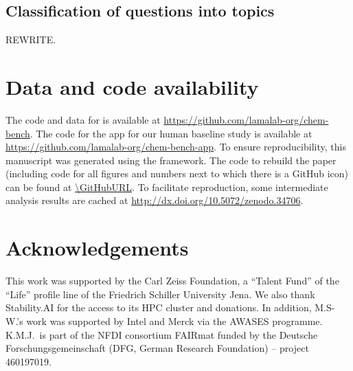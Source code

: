 \documentclass[11pt, oneside]{article}
\begin{document}
\begin{refsection}
\subsection{Classification of questions into topics}\label{sec:meth-topic} 

REWRITE. 

\section*{Data and code availability}
The code and data for \chembench is available at \url{https://github.com/lamalab-org/chem-bench}.
The code for the app for our human baseline study is available at \url{https://github.com/lamalab-org/chem-bench-app}. 
To ensure reproducibility, this manuscript was generated using the \href{https://show-your.work/en/latest/}{\showyourwork} framework.\autocite{Luger2021}
The code to rebuild the paper (including code for all figures and numbers next to which there is a GitHub icon) can be found at \url{\GitHubURL}. 
To facilitate reproduction, some intermediate analysis results are cached at \url{http://dx.doi.org/10.5072/zenodo.34706}.

\section*{Acknowledgements}
This work was supported by the Carl Zeiss Foundation, a \enquote{Talent Fund} of the \enquote{Life} profile line of the Friedrich Schiller University Jena.
We also thank Stability.AI for the access to its HPC cluster and donations. In addition, M.S-W.'s work was supported by Intel and Merck via the AWASES programme. 
K.M.J.\ is part of the NFDI consortium FAIRmat funded by the Deutsche Forschungsgemeinschaft (DFG, German Research Foundation) – project 460197019.


\end{refsection}
\end{document}
